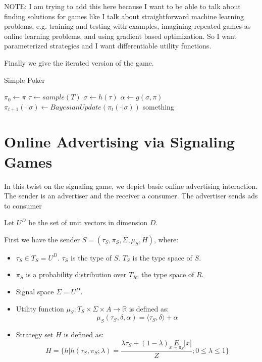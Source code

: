 \documentclass{article}
\begin{document}
NOTE: I am trying to add this here because I want to be able to talk about finding solutions for games like I talk about straightforward machine learning problems, e.g. training and testing with examples, imagining repeated games as online learning problems, and using gradient based optimization. So I want parameterized strategies and I want differentiable utility functions.

Finally we give the iterated version of the game.

\begin{algorithm}
	\caption{Simple Poker}\label{simplepokeralgo}
	\begin{algorithmic}[1]
	\STATE $\pi_0 \leftarrow \pi$
		\STATE $\tau \leftarrow sample(T)$
		\STATE $\sigma \leftarrow h(\tau)$
		\STATE $\alpha \leftarrow g(\sigma, \pi)$
		\STATE $\pi_{t+1}(\cdot|\sigma) \leftarrow BayesianUpdate(\pi_t(\cdot|\sigma))$
		\IF{$\tau = \alpha$} \STATE something \ENDIF
	\ENDFOR
	\end{algorithmic}
\end{algorithm}

\newpage

\section{Online Advertising via Signaling Games}

In this twist on the signaling game, we depict basic online advertising interaction. The sender is an advertiser and the receiver a consumer. The advertiser sends ads to consumer

Let $U^D$ be the set of unit vectors in dimension $D$.

First we have the sender $S = (\tau_S, \pi_S, \Sigma, \mu_S, H)$, where:
\begin{itemize}
	\item $\tau_S \in T_S = U^D$. $\tau_S$ is the type of $S$. $T_S$ is the type space of $S$.
	\item $\pi_S$ is a probability distribution over $T_R$, the type space of $R$.
	\item Signal space $\Sigma = U^D$.
	\item Utility function $\mu_S: T_S \times \Sigma \times A \rightarrow \mathbb{R}$ is defined as:
	\begin{equation}
		\mu_S(\tau_S, \delta, \alpha) = \langle \tau_S, \delta \rangle + \alpha
	\end{equation}
	\item Strategy set $H$ is defined as:
	\begin{equation}
		H = \lbrace h | h(\tau_S, \pi_S; \lambda) = \frac{\lambda \tau_S + (1-\lambda)\underset{x\sim\pi_S}{E}\lbrack x \rbrack}{Z}; 0 \le \lambda \le 1 \rbrace
	\end{equation}
\end{itemize}
\end{document}

